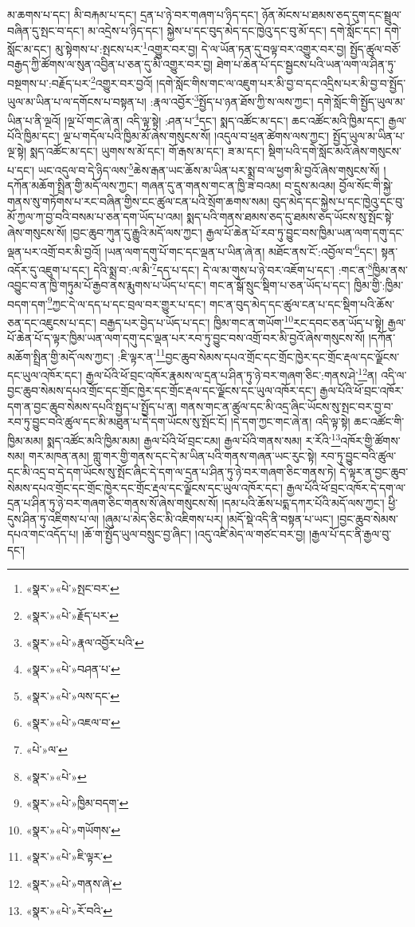 མ་ཆགས་པ་དང་། མི་བརྐམ་པ་དང་། དྲན་པ་ཉེ་བར་གཞག་པ་ཉིད་དང་། ཉོན་མོངས་པ་ཐམས་ཅད་དུག་དང་སྦྲུལ་བཞིན་དུ་སྤང་བ་དང་། མ་འདྲེས་པ་ཉིད་དང་། སྐྱེས་པ་དང་བུད་མེད་དང་ཁྱེའུ་དང་བུ་མོ་དང་། དགེ་སློང་དང་། དགེ་སློང་མ་དང་། མུ་སྟེགས་པ་:སྤངས་པར་\footnote{«སྣར་»«པེ་»སྤང་བར་}འགྱུར་བར་བྱ། དེ་ལ་ཡོན་ཏན་དུ་བལྟ་བར་འགྱུར་བར་བྱ། སྤྱོད་ཚུལ་བཅོ་བརྒྱད་ཀྱི་ཚོགས་ལ་སུན་འབྱིན་པ་ཅན་དུ་མི་འགྱུར་བར་བྱ། ཐེག་པ་ཆེན་པོ་དང་སྦྱངས་པའི་ཡན་ལག་ལ་ཤིན་ཏུ་བསྔགས་པ་:བརྗོད་པར་\footnote{«སྣར་»«པེ་»རྗོད་པར་}འགྱུར་བར་བྱའོ། །དགེ་སློང་གིས་གང་ལ་འཇུག་པར་མི་བྱ་བ་དང་འདྲིས་པར་མི་བྱ་བ་སྤྱོད་ཡུལ་མ་ཡིན་པ་ལ་དགོངས་པ་བསྟན་པ། :རྣལ་འབྱོར་\footnote{«སྣར་»«པེ་»རྣལ་འབྱོར་པའི་}སྤྱོད་པ་ཉན་ཐོས་ཀྱི་ས་ལས་ཀྱང་། དགེ་སློང་གི་སྤྱོད་ཡུལ་མ་ཡིན་པ་ནི་ལྔའོ། །ལྔ་པོ་གང་ཞེ་ན། འདི་ལྟ་སྟེ། :ཤན་པ་\footnote{«སྣར་»«པེ་»བཤན་པ་}དང་། སྨད་འཚོང་མ་དང་། ཆང་འཚོང་མའི་ཁྱིམ་དང་། རྒྱལ་པོའི་ཁྱིམ་དང་། ལྔ་པ་གདོལ་པའི་ཁྱིམ་མོ་ཞེས་གསུངས་སོ། །འདུལ་བ་ཕྲན་ཚེགས་ལས་ཀྱང་། སྤྱོད་ཡུལ་མ་ཡིན་པ་ལྔ་སྟེ། སྨད་འཚོང་མ་དང་། ཡུགས་ས་མོ་དང་། གོ་རྒས་མ་དང་། ཟ་མ་དང་། སྡིག་པའི་དགེ་སློང་མའོ་ཞེས་གསུངས་པ་དང་། ཡང་འདུལ་བ་དེ་ཉིད་ལས་\footnote{«སྣར་»«པེ་»ལས་དང་}ཆེས་རྒན་ཡང་ཆོས་མ་ཡིན་པར་སྨྲ་བ་ལ་ཕྱག་མི་བྱའོ་ཞེས་གསུངས་སོ། །དཀོན་མཆོག་སྤྲིན་གྱི་མདོ་ལས་ཀྱང་། གཞན་དུ་ན་གནས་གང་ན་ཁྱི་ཟ་བའམ། བ་དྲུས་མའམ། བྱོལ་སོང་གི་སྐྱེ་གནས་སུ་གཏོགས་པ་རང་བཞིན་གྱིས་ངང་ཚུལ་ངན་པའི་སྲོག་ཆགས་སམ། བུད་མེད་དང་སྐྱེས་པ་དང་ཁྱེའུ་དང་བུ་མོ་ཀྱལ་ཀ་བྱ་བའི་བསམ་པ་ཅན་དག་ཡོད་པ་འམ། སྨད་པའི་གནས་ཐམས་ཅད་དུ་ཐམས་ཅད་ཡོངས་སུ་སྤོང་སྟེ་ཞེས་གསུངས་སོ། །བྱང་ཆུབ་ཀུན་དུ་རྒྱུའི་མདོ་ལས་ཀྱང་། རྒྱལ་པོ་ཆེན་པོ་རབ་ཏུ་བྱུང་བས་ཁྱིམ་ཡན་ལག་དགུ་དང་ལྡན་པར་འགྲོ་བར་མི་བྱའོ། །ཡན་ལག་དགུ་པོ་གང་དང་ལྡན་པ་ཡིན་ཞེ་ན། མཐོང་ནས་ངོ་:འབྱོལ་བ་\footnote{«སྣར་»«པེ་»འཇལ་བ་}དང་། སྟན་འདོར་དུ་འཇུག་པ་དང་། དེའི་སྨྲ་བ་:ལ་མི་\footnote{«པེ་»ལ་}དད་པ་དང་། དེ་ལ་མ་གུས་པ་ཉེ་བར་འཇོག་པ་དང་། :གང་ན་\footnote{«སྣར་»«པེ་»}ཁྱིམ་ནས་འབྱུང་བ་ན་ཁྱི་གཏུམ་པོ་རྒྱབ་ནས་རྨུགས་པ་ཡོད་པ་དང་། གང་ན་སྒོ་སྲུང་སྡིག་པ་ཅན་ཡོད་པ་དང་། ཁྱིམ་གྱི་:ཁྱིམ་བདག་དག་\footnote{«སྣར་»«པེ་»ཁྱིམ་བདག་}ཀྱང་དེ་ལ་དད་པ་དང་བྲལ་བར་གྱུར་པ་དང་། གང་ན་བུད་མེད་དང་ཚུལ་ངན་པ་དང་སྡིག་པའི་ཆོས་ཅན་དང་འཇུངས་པ་དང་། བརྒྱད་པར་བྱེད་པ་ཡོད་པ་དང་། ཁྱིམ་གང་ན་གཡོག་\footnote{«སྣར་»«པེ་»གཡོགས་}རང་དབང་ཅན་ཡོད་པ་སྟེ། རྒྱལ་པོ་ཆེན་པོ་ད་ལྟར་ཁྱིམ་ཡན་ལག་དགུ་དང་ལྡན་པར་རབ་ཏུ་བྱུང་བས་འགྲོ་བར་མི་བྱའོ་ཞེས་གསུངས་སོ། །དཀོན་མཆོག་སྤྲིན་གྱི་མདོ་ལས་ཀྱང་། :ཇི་ལྟར་ན་\footnote{«སྣར་»«པེ་»ཇི་ལྟར་}བྱང་ཆུབ་སེམས་དཔའ་གྲོང་དང་གྲོང་ཁྱེར་དང་གྲོང་རྡལ་དང་ལྗོངས་དང་ཡུལ་འཁོར་དང་། རྒྱལ་པོའི་ཕོ་བྲང་འཁོར་རྣམས་ལ་དྲན་པ་ཤིན་ཏུ་ཉེ་བར་གཞག་ཅིང་:གནས་ཤེ་\footnote{«སྣར་»«པེ་»གནས་ཞེ་}ན། འདི་ལ་བྱང་ཆུབ་སེམས་དཔའ་གྲོང་དང་གྲོང་ཁྱེར་དང་གྲོང་རྡལ་དང་ལྗོངས་དང་ཡུལ་འཁོར་དང་། རྒྱལ་པོའི་ཕོ་བྲང་འཁོར་དག་ན་བྱང་ཆུབ་སེམས་དཔའི་སྤྱད་པ་སྤྱོད་པ་ན། གནས་གང་ན་ཚུལ་དང་མི་འདྲ་ཞིང་ཡོངས་སུ་སྤང་བར་བྱ་བ་རབ་ཏུ་བྱུང་བའི་ཚུལ་དང་མི་མཐུན་པ་དེ་དག་ཡོངས་སུ་སྤོང་ངོ། །དེ་དག་ཀྱང་གང་ཞེ་ན། འདི་ལྟ་སྟེ། ཆང་འཚོང་གི་ཁྱིམ་མམ། སྨད་འཚོང་མའི་ཁྱིམ་མམ། རྒྱལ་པོའི་ཕོ་བྲང་ངམ། རྒྱལ་པོའི་གནས་སམ། ར་རོའི་\footnote{«སྣར་»«པེ་»རོ་བའི་}འཁོར་གྱི་ཚོགས་སམ། གར་མཁན་ནམ། གླུ་གར་གྱི་གནས་དང་དེ་མ་ཡིན་པའི་གནས་གཞན་ཡང་རུང་སྟེ། རབ་ཏུ་བྱུང་བའི་ཚུལ་དང་མི་འདྲ་བ་དེ་དག་ཡོངས་སུ་སྤོང་ཞིང་དེ་དག་ལ་དྲན་པ་ཤིན་ཏུ་ཉེ་བར་གཞག་ཅིང་གནས་ཏེ། དེ་ལྟར་ན་བྱང་ཆུབ་སེམས་དཔའ་གྲོང་དང་གྲོང་ཁྱེར་དང་གྲོང་རྡལ་དང་ལྗོངས་དང་ཡུལ་འཁོར་དང་། རྒྱལ་པོའི་ཕོ་བྲང་འཁོར་དེ་དག་ལ་དྲན་པ་ཤིན་ཏུ་ཉེ་བར་གཞག་ཅིང་གནས་སོ་ཞེས་གསུངས་སོ། །དམ་པའི་ཆོས་པདྨ་དཀར་པོའི་མདོ་ལས་ཀྱང་། ཕྱི་དུས་ཤིན་ཏུ་འཇིགས་པ་ལ། །ཞུམ་པ་མེད་ཅིང་མི་འཇིགས་པར། །མདོ་སྡེ་འདི་ནི་བསྟན་པ་ཡང་། །བྱང་ཆུབ་སེམས་དཔའ་གང་འདོད་པ། །ཆོ་ག་སྤྱོད་ཡུལ་བསྲུང་བྱ་ཞིང་། །འདུ་འཛི་མེད་ལ་གཙང་བར་བྱ། །རྒྱལ་པོ་དང་ནི་རྒྱལ་བུ་དང་། 
